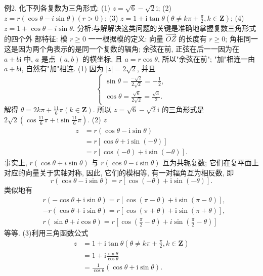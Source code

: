 例2. 化下列各复数为三角形式:
(1) $z=\sqrt{6}-\sqrt{2} \mathrm{i}$;
(2) $z=r(\cos \theta-i \sin \theta)(r>0)$;
(3) $z=1+\mathrm{i} \tan \theta\left(\theta \neq k \pi+\frac{\pi}{2}, k \in \mathbf{Z}\right)$;
(4) $z=1+\cos \theta-i \sin \theta$.
分析:与解解决这类问题的关键是准确地掌握复数三角形式的四个外 部特征:
模 $r \geqslant 0$ 一一根据模的定义: 向量 $\overrightarrow{O Z}$ 的长度有 $r \geqslant 0$;
角相同一这是因为两个角表示的是同一个复数的辐角;
余弦在前, 正弦在后一一因为在 $a+b \mathrm{i}$ 中, $a$ 是点 $(a, b)$ 的横坐标, 且 $a= r \cos \theta$, 所以"余弦在前";
"加"相连一由 $a+b \mathrm{i}$, 自然有"加"相连.
(1) 因为 $|z|=2 \sqrt{2}$, 并且
$$
\left\{\begin{array}{l}
\sin \theta=\frac{-\sqrt{2}}{2 \sqrt{2}}=-\frac{1}{2}, \\
\cos \theta=\frac{\sqrt{6}}{2 \sqrt{2}}=\frac{\sqrt{3}}{2} .
\end{array}\right.
$$
解得 $\theta=2 k \pi+\frac{11}{6} \pi(k \in \mathbf{Z})$.
所以 $z=\sqrt{6}-\sqrt{2} \mathrm{i}$ 的三角形式是 $2 \sqrt{2}\left(\cos \frac{11}{6} \pi+\mathrm{i} \sin \frac{11}{6} \pi\right)$.
(2) $z$
$$
\begin{aligned}
z & =r(\cos \theta-\mathrm{i} \sin \theta) \\
& =r[\cos \theta+\mathrm{i} \sin (-\theta)] \\
& =r[\cos (-\theta)+\mathrm{i} \sin (-\theta)] .
\end{aligned}
$$
事实上, $r(\cos \theta+i \sin \theta)$ 与 $r(\cos \theta-i \sin \theta)$ 互为共轭复数; 它们在复平面上对应的向量关于实轴对称, 因此, 它们的模相等, 有一对辐角互为相反数, 即
$$
r(\cos \theta-\mathrm{i} \sin \theta)=r[\cos (-\theta)+\mathrm{i} \sin (-\theta)] .
$$
类似地有
$$
\begin{aligned}
& r(-\cos \theta+\mathrm{i} \sin \theta)=r[\cos (\pi-\theta)+\mathrm{i} \sin (\pi-\theta)], \\
& -r(\cos \theta+\mathrm{i} \sin \theta)=r[\cos (\pi+\theta)+\mathrm{i} \sin (\pi+\theta)], \\
& r(\sin \theta+i \cos \theta)=r\left[\cos \left(\frac{\pi}{2}-\theta\right)+i \sin \left(\frac{\pi}{2}-\theta\right)\right]
\end{aligned}
$$
等等.
(3)利用三角函数公式
$$
\begin{aligned}
z & =1+\mathrm{i} \tan \theta\left(\theta \neq k \pi+\frac{\pi}{2}, k \in \mathbf{Z}\right) \\
& =1+\mathrm{i} \frac{\sin \theta}{\cos \theta} \\
& =\frac{1}{\cos \theta}(\cos \theta+\mathrm{i} \sin \theta) .
\end{aligned}
$$
